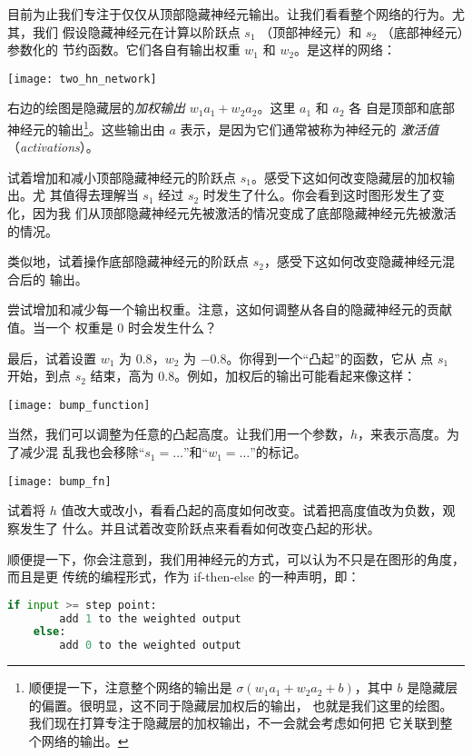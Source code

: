目前为止我们专注于仅仅从顶部隐藏神经元输出。让我们看看整个网络的行为。尤其，我们
假设隐藏神经元在计算以阶跃点 $s_1$ （顶部神经元）和 $s_2$ （底部神经元）参数化的
节约函数。它们各自有输出权重 $w_1$ 和 $w_2$。是这样的网络：
\begin{center}
  \texttt{[image: two\_hn\_network]}
\end{center}

右边的绘图是隐藏层的\emph{加权输出} $w_1 a_1 + w_2 a_2$。这里 $a_1$ 和 $a_2$ 各
自是顶部和底部神经元的输出\footnote{顺便提一下，注意整个网络的输出是 $\sigma(w_1
  a_1+w_2 a_2 + b)$，其中 $b$ 是隐藏层的偏置。很明显，这不同于隐藏层加权后的输出，
  也就是我们这里的绘图。我们现在打算专注于隐藏层的加权输出，不一会就会考虑如何把
  它关联到整个网络的输出。}。这些输出由 $a$ 表示，是因为它们通常被称为神经元的
\emph{激活值}（\emph{activations}）。

试着增加和减小顶部隐藏神经元的阶跃点 $s_1$。感受下这如何改变隐藏层的加权输出。尤
其值得去理解当 $s_1$ 经过 $s_2$ 时发生了什么。你会看到这时图形发生了变化，因为我
们从顶部隐藏神经元先被激活的情况变成了底部隐藏神经元先被激活的情况。

类似地，试着操作底部隐藏神经元的阶跃点 $s_2$，感受下这如何改变隐藏神经元混合后的
输出。

尝试增加和减少每一个输出权重。注意，这如何调整从各自的隐藏神经元的贡献值。当一个
权重是 0 时会发生什么？

最后，试着设置 $w_1$ 为 $0.8$，$w_2$ 为 $-0.8$。你得到一个“凸起”的函数，它从
点 $s_1$ 开始，到点 $s_2$ 结束，高为 $0.8$。例如，加权后的输出可能看起来像这样：
\begin{center}
  \texttt{[image: bump\_function]}
\end{center}

当然，我们可以调整为任意的凸起高度。让我们用一个参数，$h$，来表示高度。为了减少混
乱我也会移除“$s_1 = \ldots$”和“$w_1 = \ldots$”的标记。
\begin{center}
  \texttt{[image: bump\_fn]}
\end{center}

试着将 $h$ 值改大或改小，看看凸起的高度如何改变。试着把高度值改为负数，观察发生了
什么。并且试着改变阶跃点来看看如何改变凸起的形状。

顺便提一下，你会注意到，我们用神经元的方式，可以认为不只是在图形的角度，而且是更
传统的编程形式，作为 {\serif if-then-else} 的一种声明，即：
\begin{lstlisting}[language=Python]
    if input >= step point:
        add 1 to the weighted output
    else:
        add 0 to the weighted output  
\end{lstlisting}


